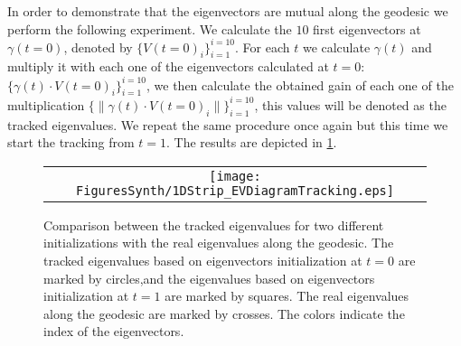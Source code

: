 \documentclass[]{article}
\theoremstyle{definition}
\begin{document}
	In order to demonstrate that the eigenvectors are mutual along the geodesic we perform the following experiment.  We calculate the $10$ first eigenvectors at $\gamma(t=0)$, denoted by $\{V(t=0)_i\}_{i=1}^{i=10}$. For each $t$ we calculate $\gamma(t)$ and multiply it with each one of the eigenvectors calculated at $t=0$: $\{\gamma(t) \cdot V(t=0)_i\}_{i=1}^{i=10}$, we then calculate the obtained gain of each one of the multiplication $\{ \| \gamma(t) \cdot V(t=0)_i \| \}_{i=1}^{i=10}$, this values will be denoted as the tracked eigenvalues. We repeat the same procedure once again but this time we start the tracking from $t=1$. The results are depicted in \ref{fig:1DStrip_EVDiagramTracking}.
	\begin{figure}[H]\centering
		\begin{tabular}{c}
			\hspace{-0.1in} \texttt{[image: FiguresSynth/1DStrip\_EVDiagramTracking.eps]}
		\end{tabular}
		\caption{Comparison between the tracked eigenvalues for two different initializations with the real eigenvalues along the geodesic. The tracked eigenvalues based on eigenvectors initialization at $t=0$ are marked by circles,and the eigenvalues based on eigenvectors initialization at $t=1$ are marked by squares. The real eigenvalues along the geodesic are marked by crosses. The colors indicate the index of the eigenvectors.}
		\label{fig:1DStrip_EVDiagramTracking}
	\end{figure}
	
\end{document}
